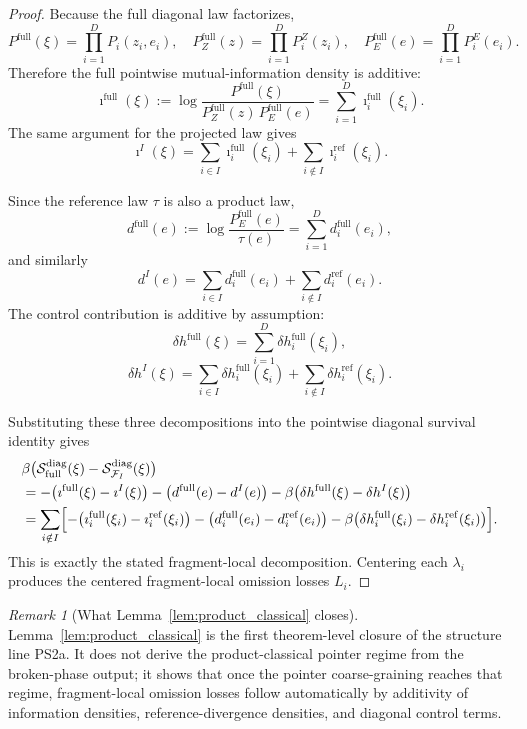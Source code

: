 \documentclass[12pt]{article}
\theoremstyle{definition}
\theoremstyle{remark}
\newtheorem{remark}[theorem]{Remark}
\begin{document}
\begin{proof}
Because the full diagonal law factorizes,
\[
P^{\mathrm{full}}(\xi)
=
\prod_{i=1}^D P_i(z_i,e_i),
\quad
P_Z^{\mathrm{full}}(z)
=
\prod_{i=1}^D P_i^Z(z_i),
\quad
P_E^{\mathrm{full}}(e)
=
\prod_{i=1}^D P_i^E(e_i).
\]
Therefore the full pointwise mutual-information density is additive:
\[
\imath^{\mathrm{full}}(\xi)
:=
\log\frac{P^{\mathrm{full}}(\xi)}
{P_Z^{\mathrm{full}}(z)\,P_E^{\mathrm{full}}(e)}
=
\sum_{i=1}^D \imath_i^{\mathrm{full}}(\xi_i).
\]
The same argument for the projected law gives
\[
\imath^{I}(\xi)
=
\sum_{i\in I}\imath_i^{\mathrm{full}}(\xi_i)
+
\sum_{i\notin I}\imath_i^{\mathrm{ref}}(\xi_i).
\]

Since the reference law \(\tau\) is also a product law,
\[
d^{\mathrm{full}}(e)
:=
\log\frac{P_E^{\mathrm{full}}(e)}{\tau(e)}
=
\sum_{i=1}^D d_i^{\mathrm{full}}(e_i),
\]
and similarly
\[
d^{I}(e)
=
\sum_{i\in I} d_i^{\mathrm{full}}(e_i)
+
\sum_{i\notin I} d_i^{\mathrm{ref}}(e_i).
\]
The control contribution is additive by assumption:
\[
\delta h^{\mathrm{full}}(\xi)
=
\sum_{i=1}^D \delta h_i^{\mathrm{full}}(\xi_i),
\]
\[
\delta h^{I}(\xi)
=
\sum_{i\in I}\delta h_i^{\mathrm{full}}(\xi_i)
+
\sum_{i\notin I}\delta h_i^{\mathrm{ref}}(\xi_i).
\]

Substituting these three decompositions into the pointwise diagonal
survival identity gives
\begin{align*}
&\beta\bigl(
\mathcal S_{\mathrm{full}}^{\mathrm{diag}}(\xi)
-
\mathcal S_{\mathcal F_I}^{\mathrm{diag}}(\xi)
\bigr) \\
&=
-\bigl(\imath^{\mathrm{full}}(\xi)-\imath^{I}(\xi)\bigr)
-\bigl(d^{\mathrm{full}}(e)-d^{I}(e)\bigr)
-\beta\bigl(
\delta h^{\mathrm{full}}(\xi)-\delta h^{I}(\xi)
\bigr) \\
&=
\sum_{i\notin I}
\Bigl[
-\bigl(\imath_i^{\mathrm{full}}(\xi_i)-\imath_i^{\mathrm{ref}}(\xi_i)\bigr)
-\bigl(d_i^{\mathrm{full}}(e_i)-d_i^{\mathrm{ref}}(e_i)\bigr)
-\beta\bigl(\delta h_i^{\mathrm{full}}(\xi_i)-\delta h_i^{\mathrm{ref}}(\xi_i)\bigr)
\Bigr].
\end{align*}
This is exactly the stated fragment-local decomposition. Centering each
\(\lambda_i\) produces the centered fragment-local omission losses
\(L_i\).
\end{proof}

\begin{remark}[What Lemma~\ref{lem:product_classical} closes]
Lemma~\ref{lem:product_classical} is the first theorem-level closure of
the structure line PS2a. It does not derive the product-classical
pointer regime from the broken-phase output; it shows that once the
pointer coarse-graining reaches that regime, fragment-local omission
losses follow automatically by additivity of information densities,
reference-divergence densities, and diagonal control terms.
\end{remark}
\end{document}
